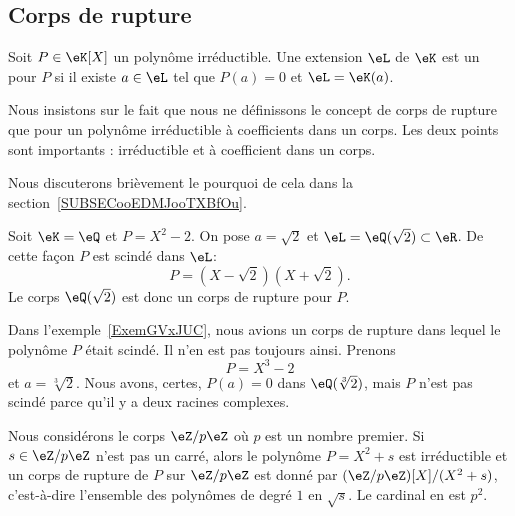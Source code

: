 \subsection{Corps de rupture}

\begin{definition}      \label{DEFooVALTooDJJmJv}
	Soit \( P\in\eK[X]\) un polynôme irréductible. Une extension \( \eL\) de \( \eK\) est un  pour \( P\) si il existe \( a\in \eL\) tel que \( P(a)=0\) et \( \eL=\eK(a)\).
\end{definition}

\begin{normaltext}      \label{NORMALooTPOIooVZAfUo}
	Nous insistons sur le fait que nous ne définissons le concept de corps de rupture que pour un polynôme irréductible à coefficients dans un corps. Les deux points sont importants : irréductible et à coefficient dans un corps.

	Nous discuterons brièvement le pourquoi de cela dans la section~\ref{SUBSECooEDMJooTXBfOu}.
\end{normaltext}

\begin{example}     \label{ExemGVxJUC}
	Soit \( \eK=\eQ\) et \( P=X^2-2\). On pose \( a=\sqrt{2}\) et \( \eL=\eQ(\sqrt{2})\subset\eR\). De cette façon \( P\) est scindé dans \( \eL \):
	\begin{equation}
		P=(X-\sqrt{2})(X+\sqrt{2}).
	\end{equation}
	Le corps \( \eQ(\sqrt{2})\) est donc un corps de rupture pour \( P\).
\end{example}

\begin{example}
	Dans l'exemple~\ref{ExemGVxJUC}, nous avions un corps de rupture dans lequel le polynôme \( P\) était scindé. Il n'en est pas toujours ainsi. Prenons
	\begin{equation}
		P=X^3-2
	\end{equation}
	et \( a=\sqrt[3]{2}\). Nous avons, certes, \( P(a)=0\) dans \( \eQ(\sqrt[3]{2})\), mais \( P\) n'est pas scindé parce qu'il y a deux racines complexes.
\end{example}

\begin{example}
	Nous considérons le corps \( \eZ/p\eZ\) où \( p\) est un nombre premier. Si \( s\in \eZ/p\eZ\) n'est pas un carré, alors le polynôme \(P= X^2+s\) est irréductible et un corps de rupture de \( P\) sur \( \eZ/p\eZ\) est donné par \( (\eZ/p\eZ)[X]/(X^2+s)\), c'est-à-dire l'ensemble des polynômes de degré \( 1\) en \( \sqrt{s}\). Le cardinal en est \( p^2\).
\end{example}

